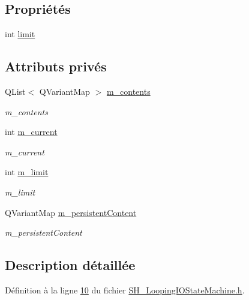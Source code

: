 \subsection*{Propriétés}
\begin{DoxyCompactItemize}
\item 
int \hyperlink{classSH__LoopingInOutStateMachine_a7b61682544bd06b52020df3e0d801d21}{limit}
\end{DoxyCompactItemize}
\subsection*{Attributs privés}
\begin{DoxyCompactItemize}
\item 
Q\-List$<$ Q\-Variant\-Map $>$ \hyperlink{classSH__LoopingInOutStateMachine_a145e625dcb4d5438bd9c761eeb9425d4}{m\-\_\-contents}
\begin{DoxyCompactList}\small\item\em m\-\_\-contents \end{DoxyCompactList}\item 
int \hyperlink{classSH__LoopingInOutStateMachine_af64f9f28a1b8e82bd9ee5f4b96a7c82e}{m\-\_\-current}
\begin{DoxyCompactList}\small\item\em m\-\_\-current \end{DoxyCompactList}\item 
int \hyperlink{classSH__LoopingInOutStateMachine_a818a60d3691fcac11323ad114c309dcb}{m\-\_\-limit}
\begin{DoxyCompactList}\small\item\em m\-\_\-limit \end{DoxyCompactList}\item 
Q\-Variant\-Map \hyperlink{classSH__LoopingInOutStateMachine_a4e9ea23cf1eecbe26c6ed93b290a9115}{m\-\_\-persistent\-Content}
\begin{DoxyCompactList}\small\item\em m\-\_\-persistent\-Content \end{DoxyCompactList}\end{DoxyCompactItemize}


\subsection{Description détaillée}


Définition à la ligne \hyperlink{SH__LoopingIOStateMachine_8h_source_l00010}{10} du fichier \hyperlink{SH__LoopingIOStateMachine_8h_source}{S\-H\-\_\-\-Looping\-I\-O\-State\-Machine.\-h}.



